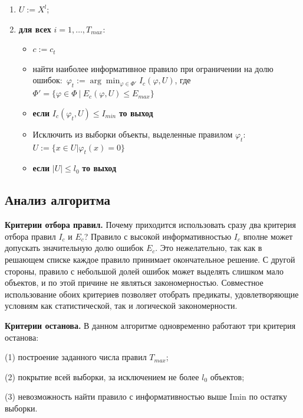 \hline
\begin{enumerate}
    \item $U := X^l;$
    \item \textbf{для всех} $i = 1, \dots, T_{max}$:
    \begin{itemize}
        \item {} $c := c_t$
        \item найти наиболее информативное правило при ограничении на долю ошибок:\
        $\varphi_t := \arg\min_{\varphi \in \Phi'} I_c(\varphi, U)$, где $\Phi' = \{ \varphi \in \Phi \ | \ E_c(\varphi, U) \leq E_{max} \}$ 

        \item \textbf{если} $I_c(\varphi_t, U) \leq I_{min}$ \textbf{то выход}
        \item Исключить из выборки объекты, выделенные правилом $\varphi_t$:
        $U := \{x \in U | \varphi_t(x) = 0\}$

        \item \textbf{если} $|U| \leq l_0$ \textbf{то выход}
    \end{itemize}
\end{enumerate}
\hline

\subsection{Анализ алгоритма}

\textbf{Критерии отбора правил.} Почему приходится использовать сразу два критерия
отбора правил $I_c$ и $E_c$? Правило с высокой информативностью $I_c$ вполне может допускать значительную долю ошибок $E_c$. Это нежелательно, так как в решающем списке каждое правило принимает окончательное решение. С другой стороны, правило с небольшой долей ошибок может выделять слишком мало объектов,
и по этой причине не являться закономерностью. Совместное использование обоих
критериев позволяет отобрать предикаты, удовлетворяющие условиям как статистической, так и логической закономерности.

\textbf{Критерии останова.} В данном алгоритме одновременно работают три критерия останова: 

(1) построение заданного числа правил $T_{max}$; 

(2) покрытие всей выборки, за исключением не более $l_0$ объектов; 

(3) невозможность найти правило с информативностью выше Imin по остатку выборки.


